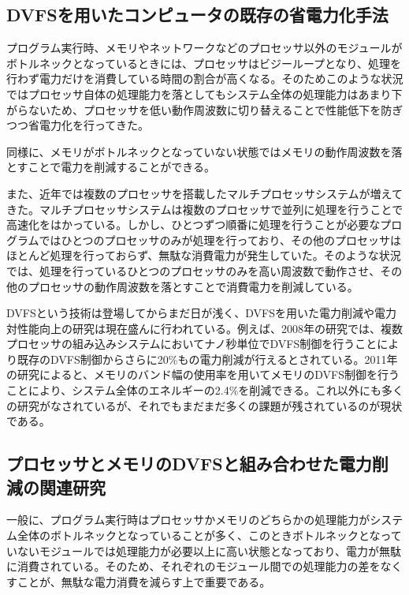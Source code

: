 \subsection{DVFSを用いたコンピュータの既存の省電力化手法}

プログラム実行時、メモリやネットワークなどのプロセッサ以外のモジュールがボトルネックとなっているときには、プロセッサはビジーループとなり、処理を行わず電力だけを消費している時間の割合が高くなる。そのためこのような状況ではプロセッサ自体の処理能力を落としてもシステム全体の処理能力はあまり下がらないため、プロセッサを低い動作周波数に切り替えることで性能低下を防ぎつつ省電力化を行ってきた。

同様に、メモリがボトルネックとなっていない状態ではメモリの動作周波数を落とすことで電力を削減することができる\cite{David:2011:MPM:1998582.1998590}。

また、近年では複数のプロセッサを搭載したマルチプロセッサシステムが増えてきた。マルチプロセッサシステムは複数のプロセッサで並列に処理を行うことで高速化をはかっている。しかし、ひとつずつ順番に処理を行うことが必要なプログラムではひとつのプロセッサのみが処理を行っており、その他のプロセッサはほとんど処理を行っておらず、無駄な消費電力が発生していた。そのような状況では、処理を行っているひとつのプロセッサのみを高い周波数で動作させ、その他のプロセッサの動作周波数を落とすことで消費電力を削減している。

DVFSという技術は登場してからまだ日が浅く、DVFSを用いた電力削減や電力対性能向上の研究は現在盛んに行われている。例えば、2008年の研究では、複数プロセッサの組み込みシステムにおいてナノ秒単位でDVFS制御を行うことにより既存のDVFS制御からさらに20\%もの電力削減が行えるとされている\cite{4658633}。2011年の研究によると、メモリのバンド幅の使用率を用いてメモリのDVFS制御を行うことにより、システム全体のエネルギーの2.4\%を削減できる\cite{David:2011:MPM:1998582.1998590}。これ以外にも多くの研究がなされているが、それでもまだまだ多くの課題が残されているのが現状である。

\subsection{プロセッサとメモリのDVFSと組み合わせた電力削減の関連研究}

一般に、プログラム実行時はプロセッサかメモリのどちらかの処理能力がシステム全体のボトルネックとなっていることが多く、このときボトルネックとなっていないモジュールでは処理能力が必要以上に高い状態となっており、電力が無駄に消費されている。そのため、それぞれのモジュール間での処理能力の差をなくすことが、無駄な電力消費を減らす上で重要である。

